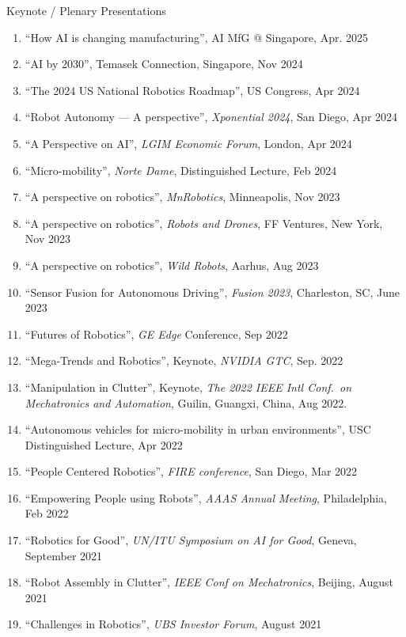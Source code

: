 \documentclass{article}
\begin{document}
\begin{cv}
	\begin{cvlist}{Keynote / Plenary Presentations}
		\item
		\begin{enumerate}
			\item ``How AI is changing manufacturing'', AI MfG @ Singapore, Apr. 2025
			\item ``AI by 2030'', Temasek Connection, Singapore, Nov 2024
			\item ``The 2024 US National Robotics Roadmap'', US Congress, Apr 2024
			\item ``Robot Autonomy --- A perspective'', {\em Xponential 2024}, San Diego, Apr 2024
			\item ``A Perspective on AI'', {\em LGIM Economic Forum}, London, Apr 2024
			\item ``Micro-mobility'', {\em Norte Dame}, Distinguished Lecture, Feb 2024
			\item ``A perspective on robotics'', {\em MnRobotics}, Minneapolis, Nov 2023
			\item ``A perspective on robotics'', {\em Robots and Drones}, FF Ventures, New
			      York, Nov 2023
			\item ``A perspective on robotics'', {\em Wild Robots}, Aarhus, Aug 2023
			\item ``Sensor Fusion for Autonomous Driving'', {\em Fusion 2023}, Charleston,
			      SC, June 2023
			\item ``Futures of Robotics'', {\em GE Edge\/} Conference, Sep 2022
			\item ``Mega-Trends and Robotics'', Keynote, {\em NVIDIA GTC}, Sep. 2022
			\item ``Manipulation in Clutter'', Keynote, {\em The 2022 IEEE Intl Conf.\ on
					      Mechatronics and Automation}, Guilin, Guangxi, China, Aug 2022.
			\item ``Autonomous vehicles for micro-mobility in urban environments'', USC
			      Distinguished Lecture, Apr 2022
			\item ``People Centered Robotics'', {\em FIRE conference}, San Diego, Mar
			      2022
			\item ``Empowering People using Robots'', {\em AAAS Annual Meeting},
			      Philadelphia, Feb 2022
			\item ``Robotics for Good'', {\em UN/ITU Symposium on AI for Good}, Geneva,
			      September 2021
			\item ``Robot Assembly in Clutter'', {\em IEEE Conf on Mechatronics}, Beijing,
			      August 2021
			\item ``Challenges in Robotics'', {\em UBS Investor Forum}, August 2021

\end{enumerate}
\end{cvlist}
\end{cv}
\end{document}

